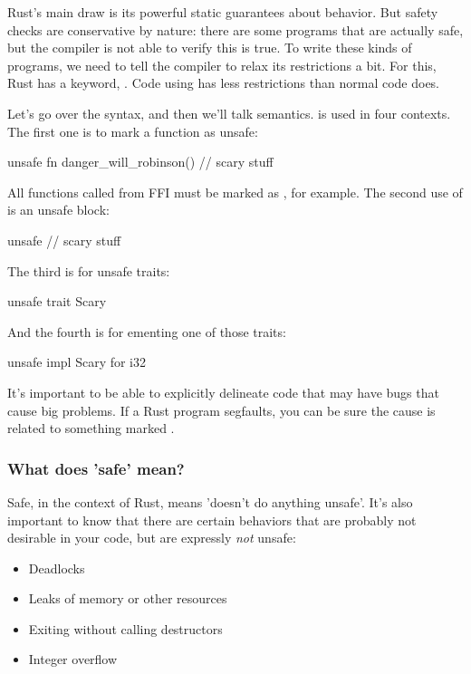 Rust's main draw is its powerful static guarantees about behavior. But safety checks are conservative by nature: there are some 
programs that are actually safe, but the compiler is not able to verify this is true. To write these kinds of programs, we need to 
tell the compiler to relax its restrictions a bit. For this, Rust has a keyword, . Code using  has less 
restrictions than normal code does.

\blank

Let's go over the syntax, and then we'll talk semantics.  is used in four contexts. The first one is to mark a function 
as unsafe:

\begin{rustc}
unsafe fn danger_will_robinson() {
    // scary stuff
}
\end{rustc}

All functions called from FFI must be marked as , for example. The second use of  is an unsafe block:

\begin{rustc}
unsafe {
    // scary stuff
}
\end{rustc}

The third is for unsafe traits:

\begin{rustc}
unsafe trait Scary { }
\end{rustc}

And the fourth is for ementing one of those traits:

\begin{rustc}
unsafe impl Scary for i32 {}
\end{rustc}

It's important to be able to explicitly delineate code that may have bugs that cause big problems. If a Rust program segfaults, you 
can be sure the cause is related to something marked .

\subsubsection*{What does 'safe' mean?}

Safe, in the context of Rust, means 'doesn't do anything unsafe'. It's also important to know that there are certain behaviors that 
are probably not desirable in your code, but are expressly \emph{not} unsafe:

\begin{itemize}
  \item{Deadlocks}
  \item{Leaks of memory or other resources}
  \item{Exiting without calling destructors}
  \item{Integer overflow}
\end{itemize}

